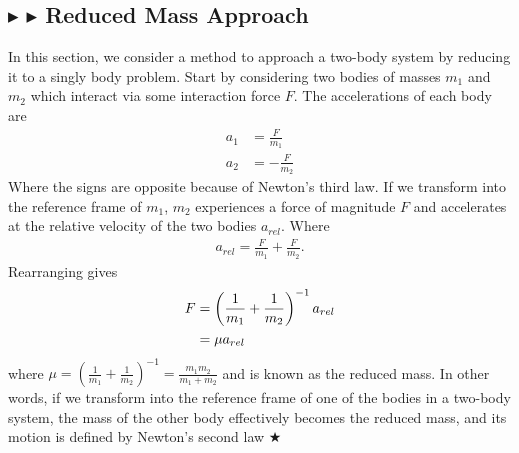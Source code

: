 \subsection{\color{Goldenrod} $\blacktriangleright$ \color{Orchid} $\blacktriangleright$ \color{black} Reduced Mass Approach}\label{1.2.5}
In this section, we consider a method to approach a two-body system by reducing it to a singly body problem. Start by considering two bodies of masses $m_1$ and $m_2$ which interact via some interaction force $F$. The accelerations of each body are
\begin{align*}
    a_1 &= \frac{F}{m_1} \\
    a_2 &= -\frac{F}{m_2} 
\end{align*}
\noindent Where the signs are opposite because of Newton's third law. If we transform into the reference frame of $m_1$, $m_2$ experiences a force of magnitude $F$ and accelerates at the relative velocity of the two bodies $a_{rel}$. Where
\begin{gather*}
    a_{rel} = \frac{F}{m_1} + \frac{F}{m_2}.
\end{gather*}
\noindent Rearranging gives 
\begin{align}
    F &= \left( \frac{1}{m_1} + \frac{1}{m_2} \right)^{-1} a_{rel} \nonumber \\
    &= \mu a_{rel}
\end{align}
\noindent where $\mu = \left( \frac{1}{m_1} + \frac{1}{m_2} \right)^{-1} = \frac{m_1m_2}{m_1 + m_2}$ and is known as the reduced mass. In other words, if we transform into the reference frame of one of the bodies in a two-body system, the mass of the other body effectively becomes the reduced mass, and its motion is defined by Newton's second law $\bigstar$

%
%
